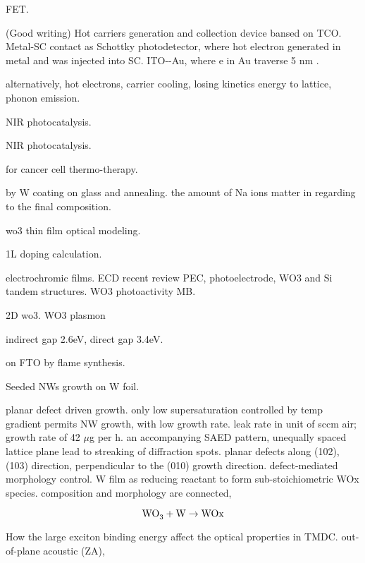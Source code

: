  FET.\cite{Li2015}

(Good writing) Hot carriers generation and collection device bansed on TCO.\cite{Gong2014a} Metal-SC contact as Schottky photodetector, where hot electron generated in metal and was injected into SC. ITO--Au, where e in Au traverse 5 nm . 

alternatively, hot electrons, carrier cooling, losing kinetics energy to lattice, phonon emission. 

NIR photocatalysis.\cite{Li2014j}

NIR photocatalysis.\cite{Pak2012}

 for cancer cell thermo-therapy. \cite{Cheng2014}


 by W coating on glass and annealing.\cite{Azimirad2009a} the amount of Na ions matter in regarding to the final composition.\cite{Mann2007} 

wo3 thin film optical modeling. \cite{Saygin-Hinczewski2008}

 1L doping calculation. \cite{Ma2011}

electrochromic films. \cite{Yoshimura1985}
ECD \cite{Jiao2012} recent review \cite{Mortimer2011}
PEC, photoelectrode, WO3 and Si tandem structures.\cite{Coridan2013}
WO3 photoactivity MB. \cite{Watcharenwong2008}

2D wo3.\cite{Kalantar-zadeh2010a} 
WO3 plasmon \cite{Manthiram2012}

 indirect gap 2.6eV, direct gap 3.4eV. \cite{Koffyberg1979}

 on FTO by flame synthesis.\cite{Rao2014} \cite{Xu2006}

Seeded  NWs growth on W foil.\cite{Hong2006a}

planar defect driven  growth.\cite{Smith2014} only low supersaturation controlled by temp gradient permits NW growth, with low growth rate. leak rate in unit of sccm air; growth rate of 42 $\mu$g per h. an accompanying SAED pattern, unequally spaced lattice plane lead to streaking of diffraction spots. planar defects along (102), (103) direction, perpendicular to the (010) growth direction. defect-mediated morphology control. W film as reducing reactant to form sub-stoichiometric WOx species. composition and morphology are connected, 

\[
\cee{WO3 + W \rightarrow WOx}
\]

How the large exciton binding energy affect the optical properties in TMDC. out-of-plane acoustic (ZA), \cite{Zhang2015tmdc}

